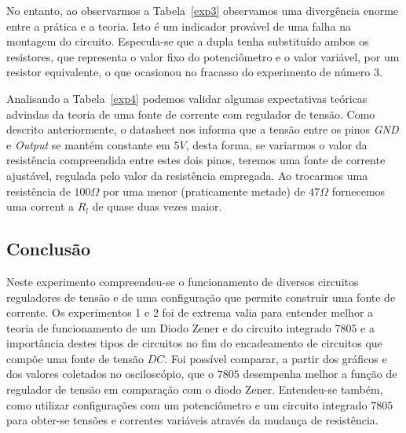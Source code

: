 \documentclass[12pt,a4paper]{article}
\begin{document}
No entanto, ao observarmos a Tabela~\ref{exp3} observamos uma divergência enorme entre a prática e a teoria. Isto é um indicador provável de uma falha na montagem do circuito. Especula-se que a dupla tenha substituído ambos os resistores, que representa o valor fixo do potenciômetro  e o valor variável, por um resistor equivalente, o que ocasionou no fracasso do experimento de número 3.

Analisando a Tabela~\ref{exp4} podemos validar algumas expectativas teóricas advindas da teoria de uma fonte de corrente com regulador de tensão. Como descrito anteriormente, o datasheet nos informa que a tensão entre os pinos \emph{GND} e \emph{Output} se mantém constante em $5V$, desta forma, se variarmos o valor da resistência compreendida entre estes dois pinos, teremos uma fonte de corrente ajustável, regulada pelo valor da resistência empregada. Ao trocarmos uma resistência de $100\Omega$ por uma menor (praticamente metade) de $47\Omega$ fornecemos uma corrent a $R_l$ de quase duas vezes maior.

\newpage
\subsection{Conclusão}
Neste experimento compreendeu-se o funcionamento de diversos circuitos reguladores de tensão e de uma configuração que permite construir uma fonte de corrente. Os experimentos 1 e 2 foi de extrema valia para entender melhor a teoria de funcionamento de um Diodo Zener e do circuito integrado $7805$ e a importância destes tipos de circuitos no fim do encadeamento de circuitos que compõe uma fonte de tensão $DC$. Foi possível comparar, a partir dos gráficos e dos valores coletados no osciloscópio, que o  $7805$ desempenha melhor a função de regulador de tensão em comparação com o diodo Zener.  Entendeu-se também, como utilizar configurações com um potenciômetro e um circuito integrado $7805$ para obter-se tensões e correntes variáveis através da mudança de resistência. 
\end{document}
